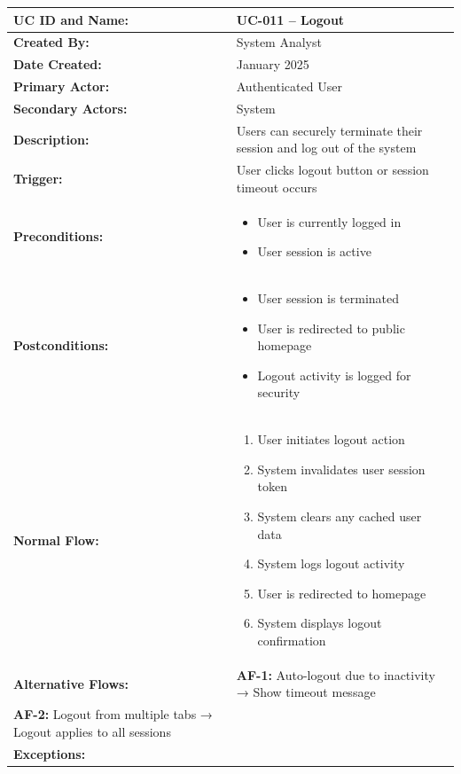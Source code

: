 \documentclass[12pt,a4paper]{article}
\begin{document}
\renewcommand{\arraystretch}{1.5}
\begin{longtable}{|p{4.5cm}|p{10.5cm}|}
\hline
\textbf{UC ID and Name:} & UC-011 – Logout \\
\hline
\textbf{Created By:} & System Analyst \\
\hline
\textbf{Date Created:} & January 2025 \\
\hline
\textbf{Primary Actor:} & Authenticated User \\
\hline
\textbf{Secondary Actors:} & System \\
\hline
\textbf{Description:} & Users can securely terminate their session and log out of the system \\
\hline
\textbf{Trigger:} & User clicks logout button or session timeout occurs \\
\hline
\textbf{Preconditions:} &
\begin{itemize}
  \item User is currently logged in
  \item User session is active
\end{itemize} \\
\hline
\textbf{Postconditions:} &
\begin{itemize}
  \item User session is terminated
  \item User is redirected to public homepage
  \item Logout activity is logged for security
\end{itemize} \\
\hline
\textbf{Normal Flow:} &
\begin{enumerate}
  \item User initiates logout action
  \item System invalidates user session token
  \item System clears any cached user data
  \item System logs logout activity
  \item User is redirected to homepage
  \item System displays logout confirmation
\end{enumerate} \\
\hline
\textbf{Alternative Flows:} &
\textbf{AF-1:} Auto-logout due to inactivity → Show timeout message \\
\textbf{AF-2:} Logout from multiple tabs → Logout applies to all sessions \\
\hline
\textbf{Exceptions:} &
\begin{itemize}

\end{itemize}
\end{longtable}
\end{document}
